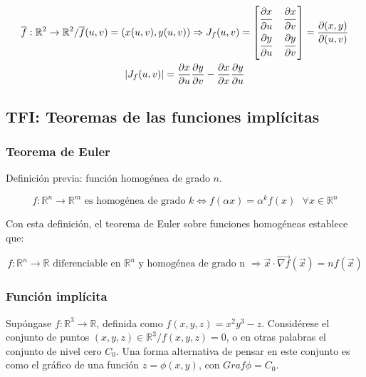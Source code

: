 \documentclass{article}
\renewcommand{\Bbb}{\mathbb}
\begin{document}
\begin{gather}
\overline{f}:\Bbb R^2 \rightarrow \Bbb R^2 / \overline{f}(u,v) = (x(u,v), y(u,v)) \Rightarrow J_f(u,v) =
\begin{bmatrix}
\dfrac{\strut \partial x}{\strut \partial u} & \dfrac{\strut \partial x}{\strut \partial v} \\
\dfrac{\strut \partial y}{\strut \partial u} & \dfrac{\strut \partial y}{\strut \partial v}
\end{bmatrix} = \frac{\partial(x,y)}{\partial(u,v)} \\
|J_f(u,v)| = \frac{\partial x}{\partial u} \frac{\partial y}{\partial v} - \frac{\partial x}{\partial x} \frac{\partial y}{\partial u}
\end{gather}

\subsection{TFI: Teoremas de las funciones implícitas}

\subsubsection{Teorema de Euler}

Definición previa: función homogénea de grado $n$.

\begin{equation}
f:\Bbb R^n \rightarrow \Bbb R^m \text{ es homogénea de grado } k \Leftrightarrow f(\alpha x) = \alpha^k f(x) \text{ } \forall x \in \Bbb R^n
\end{equation}

Con esta definición, el teorema de Euler sobre funciones homogéneas establece que:

\begin{equation}
f:\Bbb R^n \rightarrow \Bbb R \text{ diferenciable en } \Bbb R^n \text{ y homogénea de grado n } \Rightarrow \overrightarrow{x} \cdot \overrightarrow{\nabla f} (\overrightarrow{x}) = n f(\overrightarrow{x})
\end{equation}

\subsubsection{Función implícita}

Supóngase $f:\Bbb R^3 \rightarrow \Bbb R$, definida como $f(x,y,z) = x^2 y^3 - z$. Considérese el conjunto de puntos $(x,y,z) \in \Bbb R^3 /f(x,y,z) = 0$, o en otras palabras el conjunto de nivel cero $C_0$. Una forma alternativa de pensar en este conjunto es como el gráfico de una función $z = \phi(x,y)$, con $Graf \phi = C_0$.
\end{document}
